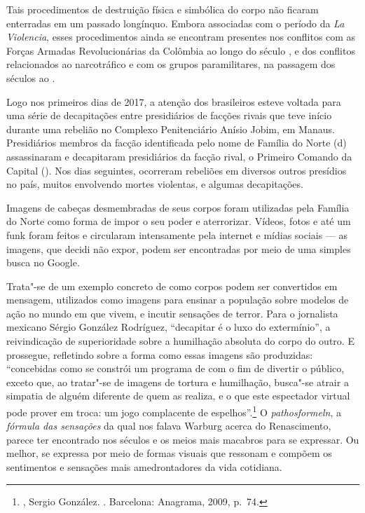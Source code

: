 Tais procedimentos de destruição física e simbólica do corpo não
ficaram enterradas em um passado longínquo. Embora associadas com o
período da \emph{La Violencia}, esses procedimentos ainda se encontram
presentes nos conflitos com as Forças Armadas Revolucionárias da
Colômbia ao longo do século , e dos conflitos relacionados ao
narcotráfico e com os grupos paramilitares, na passagem dos séculos 
ao .

\asterisc

Logo nos primeiros dias de 2017, a atenção dos brasileiros esteve
voltada para uma série de decapitações entre presidiários de facções
rivais que teve início durante uma rebelião no Complexo Penitenciário
Anísio Jobim, em Manaus. Presidiários membros da facção identificada
pelo nome de Família do Norte (d) assassinaram e decapitaram
presidiários da facção rival, o Primeiro Comando da Capital (). Nos
dias seguintes, ocorreram rebeliões em diversos outros presídios no
país, muitos envolvendo mortes violentas, e algumas decapitações.

Imagens de cabeças desmembradas de seus corpos foram utilizadas pela
Família do Norte como forma de impor o seu poder e aterrorizar. Vídeos,
fotos e até um funk foram feitos e circularam intensamente pela internet
e mídias sociais --- as imagens, que decidi não expor, podem ser
encontradas por meio de uma simples busca no Google.

Trata"-se de um exemplo concreto de como corpos podem ser convertidos em
mensagem, utilizados como imagens para ensinar a população sobre modelos
de ação no mundo em que vivem, e incutir sensações de terror. Para o
jornalista mexicano Sérgio González Rodríguez, ``decapitar é o luxo do
extermínio'', a reivindicação de superioridade sobre a humilhação
absoluta do corpo do outro. E prossegue, refletindo sobre a forma como
essas imagens são produzidas: ``concebidas como se constrói um programa
de  com o fim de divertir o público, exceto que, ao tratar"-se de
imagens de tortura e humilhação, busca"-se atrair a simpatia de alguém
diferente de quem as realiza, e o que este espectador virtual pode
prover em troca: um jogo complacente de espelhos''.\footnote{,
  Sergio González. {}. Barcelona: Anagrama,
  2009, p.~74.} O \emph{pathosformeln}, a \emph{fórmula das
sensações} da qual nos falava Warburg acerca do Renascimento, parece ter
encontrado nos séculos  e  os meios mais macabros para se
expressar. Ou melhor, se expressa por meio de formas visuais que
ressonam e compõem os sentimentos e sensações mais amedrontadores da
vida cotidiana.

